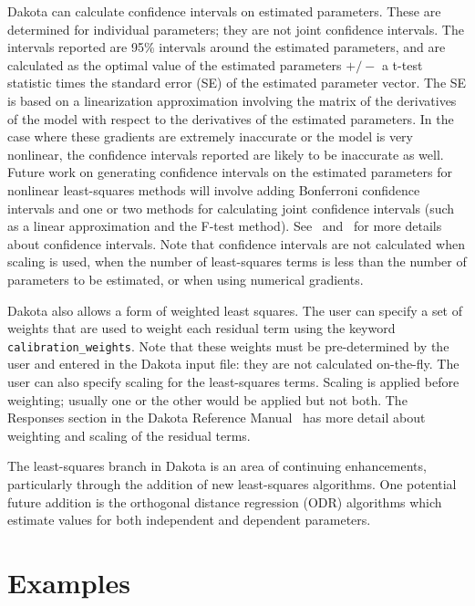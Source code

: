 Dakota can calculate confidence intervals on estimated parameters.
These are determined for individual parameters; they are not joint
confidence intervals. The intervals reported are 95\% intervals
around the estimated parameters, and are calculated as the optimal
value of the estimated parameters $+/-$ a t-test statistic times the
standard error (SE) of the estimated parameter vector. The SE is
based on a linearization approximation involving the matrix of the
derivatives of the model with respect to the derivatives of the
estimated parameters. In the case where these gradients are extremely
inaccurate or the model is very nonlinear, the confidence intervals
reported are likely to be inaccurate as well. Future work on
generating confidence intervals on the estimated parameters for
nonlinear least-squares methods will involve adding Bonferroni
confidence intervals and one or two methods for calculating joint
confidence intervals (such as a linear approximation and the F-test
method). See~\cite{Seb03} and~\cite{Vug07} for more details about
confidence intervals. Note that confidence intervals are not
calculated when scaling is used, when the number of least-squares
terms is less than the number of parameters to be estimated, or when
using numerical gradients.

Dakota also allows a form of weighted least squares. The user can
specify a set of weights that are used to weight each residual term
using the keyword \texttt{calibration\_weights}. Note that these
weights must be pre-determined by the user and entered in the Dakota
input file: they are not calculated on-the-fly. The user can also
specify scaling for the least-squares terms. Scaling is applied
before weighting; usually one or the other would be applied but not
both. The Responses section in the Dakota Reference
Manual~\cite{RefMan} has more detail about weighting and scaling of
the residual terms.

The least-squares branch in Dakota is an area of continuing
enhancements, particularly through the addition of new least-squares
algorithms. One potential future addition is the orthogonal distance
regression (ODR) algorithms which estimate values for both independent
and dependent parameters.

\section{Examples}\label{nls:examples}

